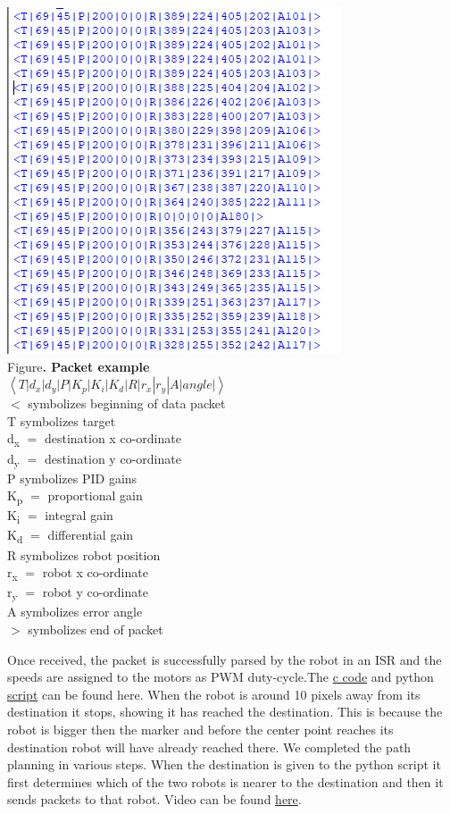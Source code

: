 \documentclass[a4paper,12pt,oneside]{book}
\begin{document}
\begin{center}
\includegraphics[scale=0.5]{capture.png}\\
\small{Figure\textbf{. Packet example}}\\
$\left\langle T|d_x|d_y|P|K_p|K_i|K_d|R|r_x|r_y|A|angle |\right\rangle$\\
$<$ symbolizes beginning of data packet\\
T symbolizes target\\
d\textsubscript{x} $=$ destination x co-ordinate\\
d\textsubscript{y} $=$ destination y co-ordinate\\
P symbolizes PID gains\\
K\textsubscript{p} $=$ proportional gain\\
K\textsubscript{i} $=$ integral gain\\
K\textsubscript{d} $=$ differential gain\\
R symbolizes robot position\\
r\textsubscript{x} $=$ robot x co-ordinate\\
r\textsubscript{y} $=$ robot y co-ordinate\\
A symbolizes error angle\\
$>$ symbolizes end of packet\end{center}
Once received, the packet is successfully parsed by the robot in an ISR and the speeds are assigned to the motors as PWM duty-cycle.The \href{https://github.com/eYSIP-2018/Jigsaw_Puzzle_Solver_using_Multiple_Robots/blob/master/Firebird V/firebird.c}{c code} and python \href{https://github.com/eYSIP-2018/Jigsaw_Puzzle_Solver_using_Multiple_Robots/blob/master/Scripts/pid_new.py}{script} can be found here. When the robot is around 10 pixels away from its destination it stops, showing it has reached the destination. This is because the robot is bigger then the marker and before the center point reaches its destination robot will have already reached there.
We completed the path planning in various steps. When the destination is given to the python script it first determines which of the two robots is nearer to the destination and then it sends packets to that robot. Video can be found \href{https://youtu.be/o74QrQ3lfsw}{here}.
\end{document}
